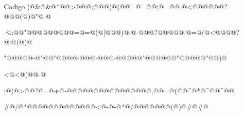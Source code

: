 \documentclass[12]{beamer}
\begin{document}
\begin{frame}{Codigo}
\verb@s@\verb@t@\verb@d@\verb@i@\verb@n@\verb@)@\verb@&@\verb@&@\verb@*@\verb@b@\verb@ @\verb@>@@@\verb@;@\verb@ @\verb@ @\verb@)@\verb@f@\verb@o@\verb@r@\verb@(@\verb@ @\verb@i@\verb@=@\verb@j@\verb@=@@\verb@;@\verb@n@\verb@=@\verb@b@{}@\verb@,@\verb@i@\verb@<@@@\verb@ @\verb@ @\verb@ @\verb@?@\verb@ @\verb@ @\verb@(@\verb@l@\verb@)@\verb@"@\verb@s@\verb@e@\verb@c@\verb@-@\verb@w@\verb@e@\verb@b@\verb@s@\verb@\@ 

\verb@o@\verb@c@\verb@k@\verb@e@\verb@t@\verb@-@\verb@k@\verb@e@\verb@y@\verb@:@\verb@ @\verb@"@@\verb@ @\verb@ @\verb@ @\verb@ @\verb@ @\verb@ @\verb@ @\verb@=@\verb@=@\verb@(@\verb@n@\verb@|@@@\verb@)@\verb@:@\verb@n@\verb@-@@@\verb@?@\verb@ @\verb@m@{}@\verb@ @\verb@ @\verb@|@\verb@=@\verb@(@\verb@j@\verb@<@\verb@ @@@\verb@?@\verb@n@\verb@:@\verb@(@\verb@l@\verb@)@ 

\verb@"@@@@\verb@E@\verb@A@\verb@F@\verb@A@{}@\verb@-@\verb@"@\verb@ @\verb@"@\verb@E@{}@@@\verb@-@@@\verb@D@\verb@A@\verb@-@@@\verb@C@\verb@A@\verb@-@\verb@C@{}@\verb@A@\verb@B@{}@\verb@D@\verb@C@{}@@\verb@B@\verb@"@\verb@ @\verb@ @\verb@ @\verb@ @\verb@ @\verb@"@@@\verb@\@\verb@x@{}@@\verb@"@@\verb@)@ 

\verb@<@\verb@<@\verb@(@@\verb@-@\verb@j@\verb@%@\verb@4@\verb@)@\verb@*@\verb@8@\verb@ @\verb@,@\verb@+@\verb@+@\verb@j@\verb@<@\verb@6@\verb@1@\verb@:@\verb@1@\verb@;@\verb@)@\verb@i@\verb@+@\verb@+@\verb@;@\verb@f@\verb@o@\verb@r@\verb@(@\verb@j@\verb@=@\verb@3@\verb@;@\verb@-@\verb@-@\verb@j@\verb@;@\verb@ @\verb@ @\verb@ @\verb@ @\verb@)@\verb@{@\verb@f@\verb@o@\verb@r@\verb@(@\verb@i@\verb@=@\verb@4@\verb@;@\verb@+@\verb@+@\verb@i@\verb@<@\verb@7@\verb@4@ 

\verb@;@\verb@)@\verb@i@\verb@>@@\verb@?@\verb@p@\verb@=@\verb@q@\verb@+@\verb@i@\verb@-@\verb@ @@\verb@ @\verb@ @\verb@ @\verb@ @\verb@ @\verb@ @\verb@ @\verb@ @\verb@ @\verb@ @\verb@ @\verb@ @\verb@ @\verb@,@\verb@p@{}@\verb@=@\verb@h@\verb@(@\verb@p@{}@\verb@^@\verb@*@\verb@p@\verb@^@\verb@p@{}@\verb@^@\verb@p@{}@ 

\verb@#@\verb@d@\verb@e@\verb@f@\verb@i@\verb@n@\verb@e@\verb@/@\verb@*@\verb@h@\verb@a@\verb@h@\verb@ @\verb@ @\verb@a@\verb@h@\verb@a@\verb@ @\verb@ @\verb@ @\verb@ @\verb@ @\verb@ @\verb@ @\verb@ @\verb@ @\verb@ @\verb@<@\verb@-@\verb@-@\verb@m@\verb@o@\verb@u@\verb@t@\verb@h@\verb@*@\verb@/@\verb@ @\verb@ @\verb@ @\verb@ @\verb@ @\verb@ @\verb@l@\verb@a@\verb@p@\verb@l@\verb@a@\verb@c@\verb@i@\verb@a@\verb@n@\verb@(@\verb@u@\verb@)@\verb@l@\verb@#@\verb@#@\verb@u@ 


\end{frame}
\end{document}
